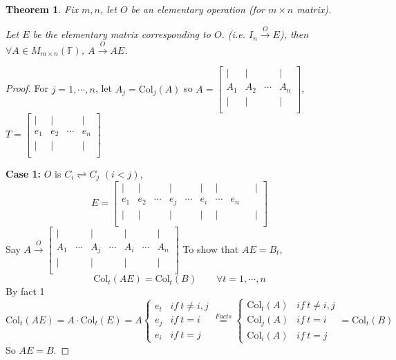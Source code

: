 \documentclass[12pt]{article}
\theoremstyle{plain}
\newtheorem{theorem}{Theorem}[subsection]
\newcommand{\Col}{\mathrm{Col}}
\newcommand{\mF}{{\mathbb{F}}}
\begin{document}
	\begin{theorem}
		Fix $m,n$, let $O$ be an elementary operation (for $m\times n$ matrix).
		
		Let $E$ be the elementary matrix corresponding to $O$. (i.e. 
		$I_n \overset{O}{\longrightarrow} E$), then 
		$\forall A \in M_{m\times n}(\mF)$, $A \overset{O}{\longrightarrow} AE$.
	\end{theorem}
	\begin{proof}
		For $j = 1,\cdots,n$, let $A_j = \Col_j(A)$ so 
		$A = \begin{bmatrix}
			| & | & & |\\
			A_1 & A_2 & \cdots & A_n\\
			| & | & & | \\
		\end{bmatrix}$, 
		$T = 
		\begin{bmatrix}
			| & | & & |\\
			e_1 & e_2 & \cdots & e_n\\
			| & | & & | \\
		\end{bmatrix}$
	
		\textbf{Case 1:}
		$O$ is $C_i \rightleftharpoons C_j$ $(i < j)$, 
		\[
			E = 
			\begin{bmatrix}
				| & | & & | &  & | & | & & & | \\
				e_1 & e_2 & \cdots & e_j & \cdots & e_i & \cdots & e_n\\
				| & | & & | &  & | & | & & & | \\
			\end{bmatrix}
		\]
		Say $A \overset{O}{\longrightarrow} 
		\begin{bmatrix}
			| &  & | & & | & & | \\
			A_1 & \cdots & A_j & \cdots & A_i & \cdots & A_n \\
			| &  & | & & | & & | \\
		\end{bmatrix}$
		To show that $AE = B_t$, 
		\[
			\Col_t(AE) = \Col_t(B) \qquad \forall t = 1,\cdots,n
		\]
		By fact 1
		\[
			\Col_t (AE) = A \cdot \Col_t(E) 
			= A 
			\begin{cases}
				e_t & if \ t \neq i, j\\
				e_j & if \ t = i\\
				e_i & if \ t = j
			\end{cases}
			\overset{Facts}{=}
			\begin{cases}
				\Col_t(A) & if \ t \neq i, j\\
				\Col_j(A) & if \ t = i\\
				\Col_i(A) & if \ t = j
			\end{cases}
			= \Col_t (B)
		\]
		So $AE = B$. 
	\end{proof}
	
\end{document}

